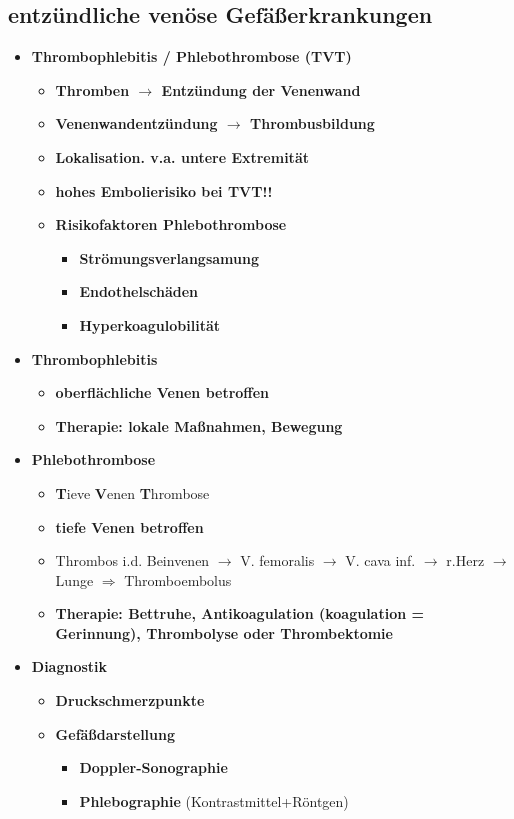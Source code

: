 	\subsection{entzündliche venöse Gefäßerkrankungen}
		\begin{itemize}
			\item \textbf{Thrombophlebitis / Phlebothrombose (TVT)}
				\begin{itemize}
					\item \textbf{Thromben $\rightarrow$ Entzündung der Venenwand}
					\item \textbf{Venenwandentzündung $\rightarrow$ Thrombusbildung}
					\item \textbf{Lokalisation. v.a. untere Extremität}
					\item \textbf{hohes Embolierisiko bei TVT!!}
					\item \textbf{Risikofaktoren Phlebothrombose}
						\begin{itemize}
							\item \textbf{Strömungsverlangsamung}
							\item \textbf{Endothelschäden}
							\item \textbf{Hyperkoagulobilität}
						\end{itemize}
				\end{itemize}
			\item \textbf{Thrombophlebitis}
				\begin{itemize}
					\item \textbf{oberflächliche Venen betroffen}
					\item \textbf{Therapie: lokale Maßnahmen, Bewegung}
				\end{itemize}
			\item \textbf{Phlebothrombose}
				\begin{itemize}
					\item \textbf{T}ieve \textbf{V}enen \textbf{T}hrombose
					\item \textbf{tiefe Venen betroffen}
					\item Thrombos i.d. Beinvenen $\rightarrow$ V. femoralis $\rightarrow$ V. cava inf. $\rightarrow$ r.Herz $\rightarrow$ Lunge $\Rightarrow$ Thromboembolus
					\item \textbf{Therapie: Bettruhe, Antikoagulation (koagulation = Gerinnung), Thrombolyse oder Thrombektomie}
				\end{itemize}
			\item \textbf{Diagnostik}
				\begin{itemize}
					\item \textbf{Druckschmerzpunkte}
					\item \textbf{Gefäßdarstellung}
						\begin{itemize}
							\item \textbf{Doppler-Sonographie}
							\item \textbf{Phlebographie} (Kontrastmittel+Röntgen)
						\end{itemize}
				\end{itemize}
		\end{itemize}
